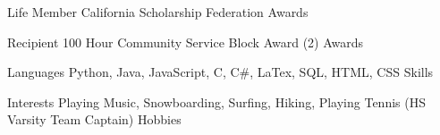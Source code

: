 \documentclass[11pt, a4paper]{awesome-cv}
\begin{document}
\begin{cvhonors}

  \cvhonor
    {Life Member} %
    {California Scholarship Federation} %
    {}
    {Awards} %

  \cvhonor
    {Recipient} %
    {100 Hour Community Service Block Award (2)} %
    {} %
    {Awards} %

  \cvhonor
    {Languages} %
    {Python, Java, JavaScript, C, C\#, LaTex, SQL, HTML, CSS} %
    {} %
    {Skills} %

  \cvhonor
    {Interests} %
    {Playing Music, Snowboarding, Surfing, Hiking, Playing Tennis (HS Varsity Team Captain)} %
    {} %
    {Hobbies} %

\end{cvhonors}
\end{document}
